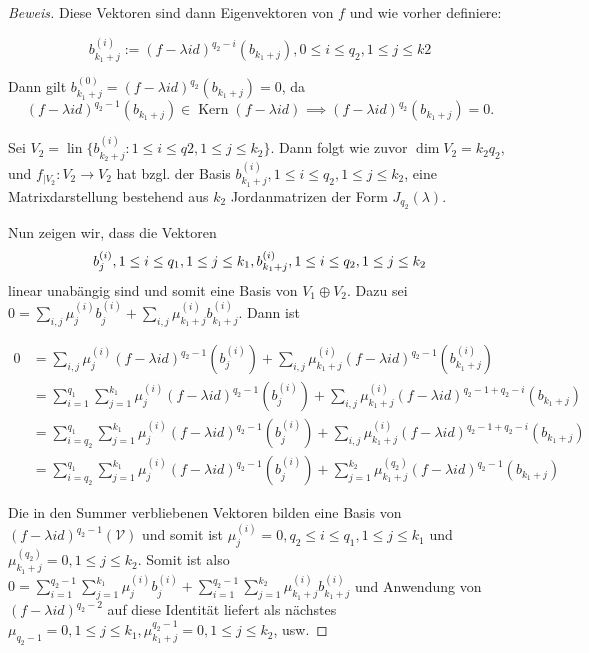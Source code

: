 \documentclass{article}
\newcommand{\V}{\mathcal{V}}
\newcommand{\basis}[2]{b_{#1}^{({#2})}}
\newcommand{\lam}{\lambda}
\newcommand{\flam}[1]{(f-{\lambda}id)^{{#1}}}
\newcommand{\funcdown}[2]{{{#1}}_{|{#2}}\colon{#2}\to{#2}}
\newcommand{\betw}[3]{{#1} \le {#2} \le {#3}}
\DeclareMathOperator{\Kern}{Kern}
\DeclareMathOperator{\lin}{lin}
\begin{document}
\begin{proof}[Beweis]
  Diese Vektoren sind dann Eigenvektoren von $f$ und wie vorher definiere:

  \begin{equation*}
    \basis{k_1+j}{i} := \flam{q_2-i}(b_{k_1+j}), 0 \le i \le q_2, 1 \le j \le k2
  \end{equation*}

  \begin{tcolorbox}
  Dann gilt $\basis{k_1+j}{0} = \flam{q_2}(b_{k_1+j}) = 0$, da
  \begin{equation*}    
    \flam{q_2-1}(b_{k_1+j}) \in \Kern \flam{} \implies \flam{q_2}(b_{k_1+j}) = 0.
  \end{equation*}
  \end{tcolorbox}
  
  Sei $V_2 = \lin \{\basis{k_2+j}{i} \colon 1 \le i \le q2, 1 \le j \le k_2\}$. Dann folgt wie
  zuvor $\dim V_2 = k_2q_2$, und $\funcdown{f}{V_2}$ hat bzgl. der Basis $\basis{k_1+j}{i},
  1 \le i \le q_2, 1 \le j \le k_2$, eine Matrixdarstellung bestehend aus $k_2$ Jordanmatrizen
  der Form $J_{q_2}(\lam)$.

  Nun zeigen wir, dass die Vektoren
  \begin{equation}
    \basis{j}{i}, \betw{1}{i}{q_1}, \betw{1}{j}{k_1}, \space
    \basis{k_1+j}{i}, \betw{1}{i}{q_2}, \betw{1}{j}{k_2}
  \end{equation}
  linear unabängig sind und somit eine Basis von $V_1 \oplus V_2$. Dazu sei
  $0 = \sum_{i,j} \mu_{j}^{(i)}\basis{j}{i} + \sum_{i,j} \mu_{k_1+j}^{(i)}\basis{k_1+j}{i}$.
  Dann ist

  \begin{align*}
    0 &= \sum_{i,j} \mu_{j}^{(i)}\flam{q_2-1}(\basis{j}{i}) + \sum_{i,j} \mu_{k_1+j}^{(i)}\flam{q_2-1}(\basis{k_1+j}{i}) \\
      &= \sum_{i=1}^{q_1}\sum_{j=1}^{k_1} \mu_{j}^{(i)}\flam{q_2-1}(\basis{j}{i}) + \sum_{i,j} \mu_{k_1+j}^{(i)}\flam{q_2-1+q_2-i}(b_{k_1+j}) \\
      &= \sum_{i=q_2}^{q_1}\sum_{j=1}^{k_1} \mu_{j}^{(i)}\flam{q_2-1}(\basis{j}{i}) + \sum_{i,j} \mu_{k_1+j}^{(i)}\flam{q_2-1+q_2-i}(b_{k_1+j}) \\
      &= \sum_{i=q_2}^{q_1}\sum_{j=1}^{k_1} \mu_{j}^{(i)}\flam{q_2-1}(\basis{j}{i}) + \sum_{j=1}^{k_2} \mu_{k_1+j}^{(q_2)}\flam{q_2-1}(b_{k_1+j})
  \end{align*}

  Die in den Summer verbliebenen Vektoren bilden eine Basis von $\flam{q_2-1}(\V)$ und somit ist
  $\mu_{j}^{(i)}=0, \betw{q_2}{i}{q_1}, \betw{1}{j}{k_1}$ und $\mu_{k_1+j}^{(q_2)}=0, \betw{1}{j}{k_2}$. Somit ist also
  $0 = \sum_{i=1}^{q_2-1}\sum_{j=1}^{k_1}\mu_{j}^{(i)}\basis{j}{i}
  + \sum_{i=1}^{q_2-1}\sum_{j=1}^{k_2}\mu_{k_1+j}^{(i)}\basis{k_1+j}{i}$ und Anwendung von
  $\flam{q_2-2}$ auf diese Identität liefert als nächstes $\mu_{q_2-1} = 0, \betw{1}{j}{k_1},
  \mu_{k_1+j}^{q_2-1}=0, \betw{1}{j}{k_2}$, usw.


\end{proof}
\end{document}

